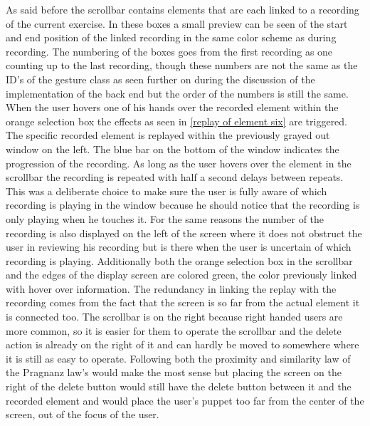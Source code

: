 As said before the scrollbar contains elements that are each linked to a recording of the current exercise. In these boxes a small preview can be seen of the start and end position of the linked recording in the same color scheme as during recording. The numbering of the boxes goes from the first recording as one counting up to the last recording, though these numbers are not the same as the ID's of the gesture class as seen further on during the discussion of the implementation of the back end but the order of the numbers is still the same. When the user hovers one of his hands over the recorded element within the orange selection box the effects as seen in \ref{replay of element six} are triggered. The specific recorded element is replayed within the previously grayed out window on the left. The blue bar on the bottom of the window indicates the progression of the recording. As long as the user hovers over the element in the scrollbar the recording is repeated with half a second delays between repeats. This was a deliberate choice to make sure the user is fully aware of which recording is playing in the window because he should notice that the recording is only playing when he touches it. For the same reasons the number of the recording is also displayed on the left of the screen where it does not obstruct the user in reviewing his recording but is there when the user is uncertain of which recording is playing. Additionally both the orange selection box in the scrollbar and the edges of the display screen are colored green, the color previously linked with hover over information. The redundancy in linking the replay with the recording comes from the fact that the screen is so far from the actual element it is connected too. The scrollbar is on the right because right handed users are more common, so it is easier for them to operate the scrollbar and the delete action is already on the right of it and can hardly be moved to somewhere where it is still as easy to operate. Following both the proximity and similarity law of the Pragnanz law's would make the most sense but placing the screen on the right of the delete button would still have the delete button between it and the recorded element and would place the user's puppet too far from the center of the screen, out of the focus of the user.\\

